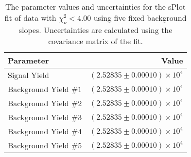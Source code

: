 
\begin{table}[ht]
    \begin{center}
        \begin{tabular}{lr}\toprule
            Parameter & Value \\\midrule
            Signal Yield & $(2.52835 \pm 0.00010) \times 10^{4}$ \\
            Background Yield $\#1$ & $(2.52835 \pm 0.00010) \times 10^{4}$ \\
            Background Yield $\#2$ & $(2.52835 \pm 0.00010) \times 10^{4}$ \\
            Background Yield $\#3$ & $(2.52835 \pm 0.00010) \times 10^{4}$ \\
            Background Yield $\#4$ & $(2.52835 \pm 0.00010) \times 10^{4}$ \\
            Background Yield $\#5$ & $(2.52835 \pm 0.00010) \times 10^{4}$ \\\bottomrule
        \end{tabular}
        \caption{The parameter values and uncertainties for the sPlot fit of data with $\chi^2_\nu < 4.00$ using five fixed background slopes. Uncertainties are calculated using the covariance matrix of the fit.}\label{tab:splot-fit-results-chisqdof-4.00-fixed-5}
    \end{center}
\end{table}
